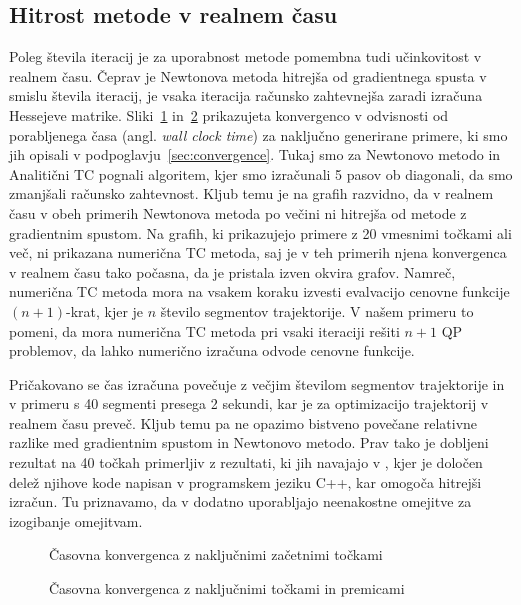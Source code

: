 \documentclass[isrm2, tisk]{fmfdelo}
\begin{document}
\subsection{Hitrost metode v realnem času}

Poleg števila iteracij je za uporabnost metode pomembna tudi učinkovitost v realnem času. Čeprav je Newtonova metoda hitrejša od gradientnega spusta v smislu števila iteracij, je vsaka iteracija računsko zahtevnejša zaradi izračuna Hessejeve matrike. Sliki~\ref{fig:convergence_time_random} in~\ref{fig:convergence_time_random_and_line} prikazujeta konvergenco v odvisnosti od porabljenega časa (angl. \textit{wall clock time}) za naključno generirane primere, ki smo jih opisali v podpoglavju~\ref{sec:convergence}. Tukaj smo za Newtonovo metodo in Analitični TC pognali algoritem, kjer smo izračunali 5 pasov ob diagonali, da smo zmanjšali računsko zahtevnost. Kljub temu je na grafih razvidno, da v realnem času v obeh primerih Newtonova metoda po večini ni hitrejša od metode z gradientnim spustom. Na grafih, ki prikazujejo primere z 20 vmesnimi točkami ali več, ni prikazana numerična TC metoda, saj je v teh primerih njena konvergenca v realnem času tako počasna, da je pristala izven okvira grafov. Namreč, numerična TC metoda mora na vsakem koraku izvesti evalvacijo cenovne funkcije $(n+1)$-krat, kjer je $n$ število segmentov trajektorije. V našem primeru to pomeni, da mora numerična TC metoda pri vsaki iteraciji rešiti $n+1$ \ac{QP} problemov, da lahko numerično izračuna odvode cenovne funkcije.

Pričakovano se čas izračuna povečuje z večjim številom segmentov trajektorije in v primeru s 40 segmenti presega 2 sekundi, kar je za optimizacijo trajektorij v realnem času preveč. Kljub temu pa ne opazimo bistveno povečane relativne razlike med gradientnim spustom in Newtonovo metodo. Prav tako je dobljeni rezultat na 40 točkah primerljiv z rezultati, ki jih navajajo v \cite{sun2021fast}, kjer je določen delež njihove kode napisan v programskem jeziku C++, kar omogoča hitrejši izračun. Tu priznavamo, da v \cite{sun2021fast} dodatno uporabljajo neenakostne omejitve za izogibanje omejitvam.

\begin{figure}
    \centering
    
    \caption{Časovna konvergenca z naključnimi začetnimi točkami}
    \label{fig:convergence_time_random}
\end{figure}

\begin{figure}
    \centering
    
    \caption{Časovna konvergenca z naključnimi točkami in premicami}
    \label{fig:convergence_time_random_and_line}
\end{figure}
\end{document}
